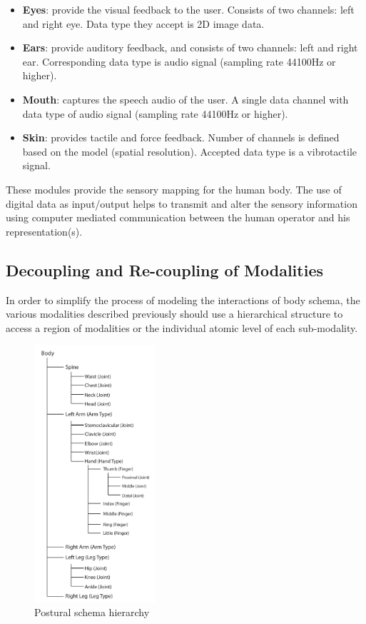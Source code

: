 \begin{itemize}
  \setlength\itemsep{0em}
\item \textbf{Eyes}: provide the visual feedback to the user. Consists of two channels: left and right eye. Data type they accept is 2D image data.

\item \textbf{Ears}: provide auditory feedback, and consists of two channels: left and right ear. Corresponding data type is audio signal (sampling rate 44100Hz or higher).

\item \textbf{Mouth}: captures the speech audio of the user. A single data channel with data type of audio signal (sampling rate 44100Hz or higher).

\item \textbf{Skin}: provides tactile and force feedback. Number of channels is defined based on the model (spatial resolution). Accepted data type is a vibrotactile signal.
\end{itemize}

These modules provide the sensory mapping for the human body. The use of digital data as input/output helps to transmit and alter the sensory information using computer mediated communication between the human operator and his representation(s).

\subsection{Decoupling and Re-coupling of Modalities}

In order to simplify the process of modeling the interactions of body schema, the various modalities described previously should use a hierarchical structure to access a region of modalities or the individual atomic level of each sub-modality. 

\begin{figure}
  \captionsetup{justification=centering}
  \centering
\includegraphics[width=0.4\textwidth]{figures/concept/PosturalSchema.pdf}
\caption{Postural schema hierarchy}
  \label{fig:concept-postural}
\end{figure}

